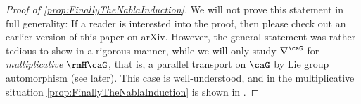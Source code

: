 \documentclass[reqno,a4paper,oneside]{amsart}
\newcommand\mutot{\mu_\caG}
\newcommand{\e}{\ensuremath{\mathrm{e\;\!}}}
\theoremstyle{plain}
\theoremstyle{remark}
\theoremstyle{definition}
\def\be{\begin{equation}}
\def\bas#1\eas{\begin{align*}#1\end{align*}}
\begin{document}
\begin{proof}[Proof of \ref{prop:FinallyTheNablaInduction}]
\leavevmode\newline
We will not prove this statement in full generality: If a reader is interested into the proof, then please check out an earlier version of this paper on arXiv. However, the general statement was rather tedious to show in a rigorous manner, while we will only study $\nabla^\caG$ for \textit{multiplicative} $\rmH\caG$, that is, a parallel transport on $\caG$ by Lie group automorphism (see later). This case is well-understood, and in the multiplicative situation \ref{prop:FinallyTheNablaInduction} is shown in \cite[Proposition 4.22]{LAURENTGENGOUXStienonXuMultiplicativeForms}.
%
%
%

\end{proof}
\end{document}
